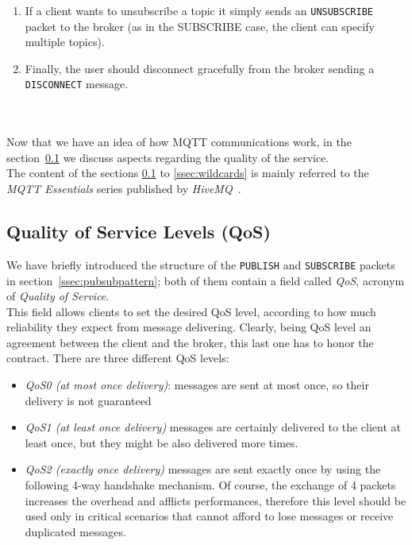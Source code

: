 \documentclass[12pt]{report}
\begin{document}
\begin{enumerate}
\item If a client wants to unsubscribe a topic it simply sends an \texttt{UNSUBSCRIBE}  packet to the broker (as in the SUBSCRIBE case, the client can specify multiple topics).

\item Finally, the user should disconnect gracefully from the broker sending a \texttt{DISCONNECT} message.\\\\\\

\end{enumerate}
\bigskip

{\setlength{\parindent}{0cm}
Now that we have an idea of how MQTT communications work, in the section~\ref{ssec:qos} we discuss aspects regarding the quality of the service.\\
The content of the sections \ref{ssec:qos} to  \ref{ssec:wildcards} is mainly referred to the \emph{MQTT Essentials} series published by \emph{HiveMQ}~\cite{hivemqessentials}.
}

\clearpage

\subsection{Quality of Service Levels (QoS)}
\label{ssec:qos}

\bigskip
We have briefly introduced the structure of the \texttt{PUBLISH} and \texttt{SUBSCRIBE} packets in section~\ref{ssec:pubsubpattern}; both of them contain a field called \emph{QoS}, acronym of \emph{Quality of Service}.\\
This field allows clients to set the desired QoS level, according to how much reliability they expect from message delivering.
Clearly, being QoS level an agreement between the client and the broker, this last one has to honor the contract.
There are three different QoS levels:

\begin{itemize}
\setlength{\itemindent}{+4mm}
\item \emph{QoS0 (at most once delivery)}: messages are sent at most once, so their delivery is not guaranteed
\item \emph{QoS1 (at least once delivery)} messages are certainly delivered to the client at least once, but they might be also delivered more times.
\item \emph{QoS2 (exactly once delivery)} messages are sent exactly once by using the following 4-way handshake mechanism.
Of course, the exchange of 4 packets increases the overhead and afflicts performances, therefore this level should be used only in critical scenarios that cannot afford to lose messages or receive duplicated messages.
\end{itemize}
\end{document}
